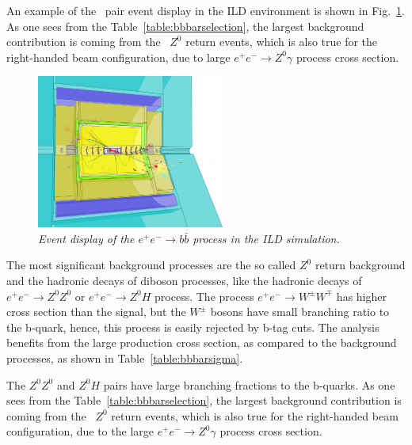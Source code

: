 An example of the \bbbar\ pair event display in the ILD environment is shown in Fig.~\ref{fig:BottomEvent_3}. As one sees from the Table~\ref{table:bbbarselection}, the largest background contribution is coming from the \bbbar\ $Z^0$ return events, which is also true for the right-handed beam configuration, due to large $e^+e^-\to Z^0\gamma$ process cross section.
\begin{figure}
	{\centering
		\includegraphics[clip, trim=0.cm 0cm 7.9cm 0cm, width=0.55\textwidth]{ILD/graphics/ild-bbbar.png}
		\caption{\sl Event display of the $e^+e^-\to b\bar{b}$ process in the ILD simulation.
		}
		\label{fig:BottomEvent_3}
	}
	
\end{figure}

The most significant background processes are the so called $Z^0$ return background and the hadronic decays of diboson processes, like the hadronic decays of $e^+e^-\to Z^0Z^0$ or $e^+e^-\to Z^0H$ process. The process $e^+e^-\to W^\pm W^\mp$ has higher cross section than the signal, but the $W^\pm$ bosons have small branching ratio to the b-quark, hence, this process is easily rejected by b-tag cuts. 
The analysis benefits from the large production cross section, as compared to the background processes, as shown in Table~\ref{table:bbbarsigma}.

The $Z^0Z^0$ and $Z^0H$ pairs have large branching fractions to the b-quarks. 
As one sees from the Table~\ref{table:bbbarselection}, the largest background contribution is coming from the \bbbar\ $Z^0$ return events, which is also true for the right-handed beam configuration, due to the large $e^+e^-\to Z^0\gamma$ process cross section.

